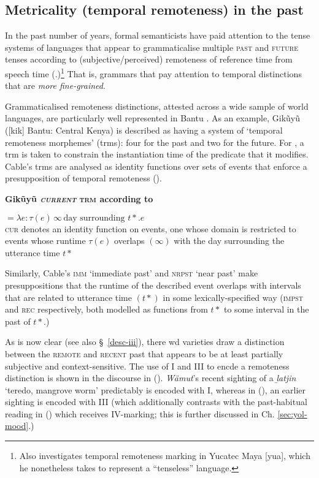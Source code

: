 \subsection{Metricality (temporal remoteness) in the past}\label{metr-sec}

In the past number of years, formal semanticists have paid attention to the tense systems of languages that appear to grammaticalise multiple \textsc{past} and \textsc{future} tenses according to (subjective/perceived) remoteness of reference time from speech time (\citealp[\textit{e.g.},][]{Cable2013,Klecha2016,Hayashi2015}.)\footnote{Also \citealp{Bohnemeyer2018} investigates temporal remoteness marking in Yucatec Maya [\gls{yua}], which he nonetheless takes to represent a ``tenseless'' language.} That is, grammars that pay attention to temporal distinctions that are \textit{more fine-grained}.

Grammaticalised remoteness distinctions, attested across a wide sample of world languages, are particularly well represented in Bantu \citep{Dahl1983,Botne2012}. As an example, Gikũyũ ([\gls{kik}] Bantu: Central Kenya) is described as having a system of `temporal remoteness morphemes' (\gls{trm}s): four for the past and two for the future. For \citet{Cable2013}, a \gls{trm} is taken to constrain the instantiation time of the predicate that it modifies. Cable's \gls{trm}s are analysed as identity functions over sets of events that enforce a presupposition of temporal remoteness (\nextx).

\pex \textbf{Gikũyũ \textsc{\textit{current} trm} according to \citet{Cable2013}}


$ =\lambda e:\tau(e)\,\infty\,\text{day surrounding }t*.e $\\
\textsc{cur} denotes an identity function on events, one whose domain is restricted to events whose runtime $ \tau(e) $ overlaps $ (\infty) $ with the day surrounding the utterance time $ t* $
\xe

Similarly, Cable's \textsc{imm} `immediate past' and \textsc{nrpst} `near past' make presuppositions that the runtime of the described event overlaps with intervals that are related to utterance time $ (t*) $ in some lexically-specified way (\textsc{impst} and \textsc{rec} respectively, both modelled as functions from $ t* $ to some interval in the past of $ t* $.)



As is now clear (see also \S~\ref{desc-iii}), there \gls{wd} varieties draw a distinction between the \textsc{remote} and \textsc{recent} past that appears to be at least partially subjective and context-sensitive. The use of \gls{I} and \gls{III} to encde a remoteness distinction is shown in the discourse in (). \textit{Wämut}'s recent sighting of a \textit{ḻatjin} `teredo, mangrove worm' predictably is encoded with \gls{I}, whereas in (), an earlier sighting is encoded with \gls{III} (which additionally contrasts with the past-habitual  reading in () which receives \gls{IV}-marking; this is further discussed in Ch. \ref{sec:yol-mood}.)




